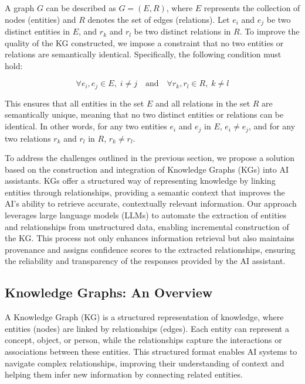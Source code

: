 A graph \( G \) can be described as \( G = (E, R) \), where \( E \) represents the collection of nodes (entities) and \( R \) denotes the set of edges (relations). Let \( e_i \) and \( e_j \) be two distinct entities in \( E \), and \( r_k \) and \( r_l \) be two distinct relations in \( R \). To improve the quality of the KG constructed, we impose a constraint that no two entities or relations are semantically identical. Specifically, the following condition must hold:

\begin{equation}
    \forall e_i, e_j \in E, \; i \neq j \quad \text{and} \quad \forall r_k, r_l \in R, \; k \neq l \tag{1}
\end{equation}

This ensures that all entities in the set \( E \) and all relations in the set \( R \) are semantically unique, meaning that no two distinct entities or relations can be identical. In other words, for any two entities \( e_i \) and \( e_j \) in \( E \), \( e_i \neq e_j \), and for any two relations \( r_k \) and \( r_l \) in \( R \), \( r_k \neq r_l \).









To address the challenges outlined in the previous section, we propose a solution based on the construction and integration of Knowledge Graphs (KGs) into AI assistants. KGs offer a structured way of representing knowledge by linking entities through relationships, providing a semantic context that improves the AI's ability to retrieve accurate, contextually relevant information. Our approach leverages large language models (LLMs) to automate the extraction of entities and relationships from unstructured data, enabling incremental construction of the KG. This process not only enhances information retrieval but also maintains provenance and assigns confidence scores to the extracted relationships, ensuring the reliability and transparency of the responses provided by the AI assistant.

\subsection{Knowledge Graphs: An Overview}

A Knowledge Graph (KG) is a structured representation of knowledge, where entities (nodes) are linked by relationships (edges). Each entity can represent a concept, object, or person, while the relationships capture the interactions or associations between these entities. This structured format enables AI systems to navigate complex relationships, improving their understanding of context and helping them infer new information by connecting related entities.

